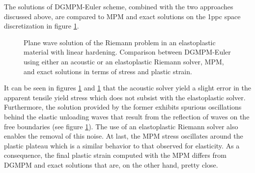 The solutions of DGMPM-Euler scheme, combined with the two approaches discussed above, are compared to MPM and exact solutions on the 1ppc space discretization in figure \ref{fig:RP_EP_dgmpm_mpm}. 
\begin{figure}[h!]
  \centering
  { \label{subfig:ep_dgmpm_mpm1}}
  { \label{subfig:ep_dgmpm_mpm2}}
  { \label{subfig:ep_dgmpm_mpm3}}
  {}
  \caption{Plane wave solution of the Riemann problem in an elastoplastic material with linear hardening. Comparison between DGMPM-Euler using either an acoustic or an elastoplastic Riemann solver, MPM, and exact solutions in terms of stress and plastic strain.}
  \label{fig:RP_EP_dgmpm_mpm}
\end{figure}
It can be seen in figures \ref{fig:RP_EP_dgmpm_mpm} and \ref{fig:RP_EP_dgmpm_mpm} that the acoustic solver yield a slight error in the apparent tensile yield stress which does not subsist with the elastoplastic solver. Furthermore, the solution provided by the former exhibits spurious oscillations behind the elastic unloading waves that result from the reflection of waves on the free boundaries (see figure \ref{fig:RP_EP_dgmpm_mpm}). The use of an elastoplastic Riemann solver also enables the removal of this noise. At last, the MPM stress oscillates around the plastic plateau which is a similar behavior to that observed for elasticity. As a consequence, the final plastic strain computed with the MPM differs from DGMPM and exact solutions that are, on the other hand, pretty close.

